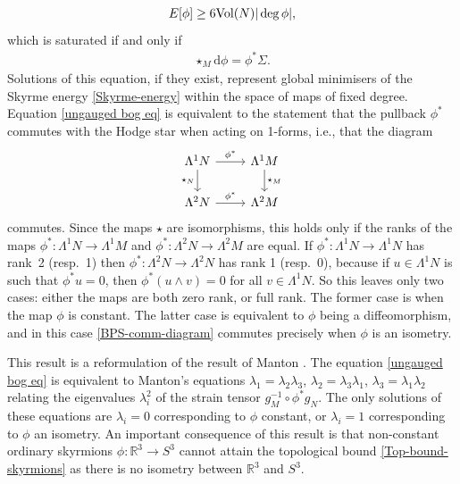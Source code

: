 \documentclass[pdftex]{sigma}
\newcommand{\R}{{\mathbb{R}}}
\newcommand{\1}{{\mathbb{1}}}
\def \d{\mathrm{d}}
\numberwithin{equation}{section}
\begin{document}
\begin{align}
E[\phi]\geq 6{\rm Vol}(N)|\deg\phi|,\label{Top-bound-skyrmions}
\end{align}
which is saturated if and only if
\begin{align}\label{ungauged bog eq}
\star_{M} \d\phi = \phi^\ast \Sigma.
\end{align}
Solutions of this equation, if they exist, represent global minimisers of the Skyrme energy \eqref{Skyrme-energy} within the space of maps of fixed degree. Equation \eqref{ungauged bog eq} is equivalent to the statement that the pullback $\phi^\ast$ commutes with the Hodge star when acting on 1-forms, i.e., that the diagram
\begin{equation}\label{BPS-comm-diagram}
\begin{tikzcd}
\Lambda^1N\arrow{r}{\phi^\ast}\arrow[swap]{d}{\star_{N}}&\Lambda^1M\arrow{d}{\star_{M}}\\
\Lambda^2N\arrow{r}{\phi^\ast}&\Lambda^2M
\end{tikzcd}
\end{equation}
commutes. Since the maps $\star$ are isomorphisms, this holds only if the ranks of the maps $\phi^\ast\colon \Lambda^1N\to\Lambda^1M$ and $\phi^\ast\colon \Lambda^2N\to\Lambda^2M$ are equal. If $\phi^\ast\colon \Lambda^1N\to\Lambda^1N$ has rank~2 (resp.~1) then $\phi^\ast\colon \Lambda^2N\to\Lambda^2N$ has rank 1 (resp.\ 0), because if $u\in\Lambda^1N$ is such that $\phi^\ast u=0$, then $\phi^\ast(u\wedge v)=0$ for all $v\in\Lambda^1N$.
So this leaves only two cases: either the maps are both zero rank, or full rank. The former case is when the map $\phi$ is constant. The latter case is equivalent to $\phi$ being a diffeomorphism, and in this case \eqref{BPS-comm-diagram} commutes precisely when $\phi$ is an isometry.

This result is a reformulation of the result of Manton \cite{Manton1987geometry}. The equation \eqref{ungauged bog eq} is equivalent to Manton's equations $\lambda_1=\lambda_2\lambda_3$, $\lambda_2=\lambda_3\lambda_1$, $\lambda_3=\lambda_1\lambda_2$ relating the eigenvalues $\lambda_i^2$ of the strain tensor $g_M^{-1}\circ\phi^\ast g_N$. The only solutions of these equations are $\lambda_i=0$ corresponding to $\phi$ constant, or $\lambda_i=1$ corresponding to $\phi$ an isometry. An important consequence of this result is that non-constant ordinary skyrmions $\phi\colon \R^3\to S^3$ cannot attain the topological bound \eqref{Top-bound-skyrmions} as there is no isometry between $\R^3$ and $S^3$.
\end{document}
